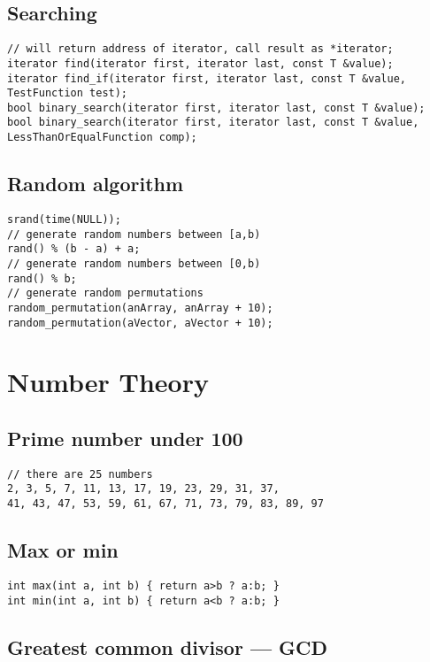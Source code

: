 \documentclass[a4paper]{article}
\begin{document}
\subsection{Searching}
\begin{verbatim}
// will return address of iterator, call result as *iterator;
iterator find(iterator first, iterator last, const T &value);
iterator find_if(iterator first, iterator last, const T &value, TestFunction test);
bool binary_search(iterator first, iterator last, const T &value);
bool binary_search(iterator first, iterator last, const T &value, LessThanOrEqualFunction comp);
\end{verbatim}

\subsection{Random algorithm}

\begin{verbatim}
srand(time(NULL));
// generate random numbers between [a,b)
rand() % (b - a) + a;
// generate random numbers between [0,b)
rand() % b; 
// generate random permutations
random_permutation(anArray, anArray + 10);
random_permutation(aVector, aVector + 10);
\end{verbatim}
	
\section{Number Theory}

\subsection{Prime number under 100}
\begin{verbatim}
// there are 25 numbers
2, 3, 5, 7, 11, 13, 17, 19, 23, 29, 31, 37,
41, 43, 47, 53, 59, 61, 67, 71, 73, 79, 83, 89, 97
\end{verbatim}

\subsection{Max or min}
\begin{verbatim}
int max(int a, int b) { return a>b ? a:b; }
int min(int a, int b) { return a<b ? a:b; }
\end{verbatim}

\subsection{Greatest common divisor --- GCD}
\end{document}
